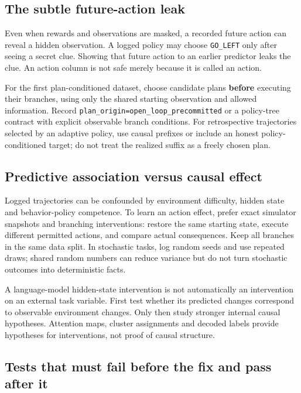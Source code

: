 \documentclass[
  11pt,
  a4paper,
]{article}
\begin{document}
\subsection{The subtle future-action
leak}\label{the-subtle-future-action-leak}

Even when rewards and observations are masked, a recorded future action
can reveal a hidden observation. A logged policy may choose
\texttt{GO\_LEFT} only after seeing a secret clue. Showing that future
action to an earlier predictor leaks the clue. An action column is not
safe merely because it is called an action.

For the first plan-conditioned dataset, choose candidate plans
\textbf{before} executing their branches, using only the shared starting
observation and allowed information. Record
\texttt{plan\_origin=open\_loop\_precommitted} or a policy-tree contract
with explicit observable branch conditions. For retrospective
trajectories selected by an adaptive policy, use causal prefixes or
include an honest policy-conditioned target; do not treat the realized
suffix as a freely chosen plan.

\subsection{Predictive association versus causal
effect}\label{predictive-association-versus-causal-effect}

Logged trajectories can be confounded by environment difficulty, hidden
state and behavior-policy competence. To learn an action effect, prefer
exact simulator snapshots and branching interventions: restore the same
starting state, execute different permitted actions, and compare actual
consequences. Keep all branches in the same data split. In stochastic
tasks, log random seeds and use repeated draws; shared random numbers
can reduce variance but do not turn stochastic outcomes into
deterministic facts.

A language-model hidden-state intervention is not automatically an
intervention on an external task variable. First test whether its
predicted changes correspond to observable environment changes. Only
then study stronger internal causal hypotheses. Attention maps, cluster
assignments and decoded labels provide hypotheses for interventions, not
proof of causal structure.

\subsection{Tests that must fail before the fix and pass after
it}\label{tests-that-must-fail-before-the-fix-and-pass-after-it}
\end{document}
